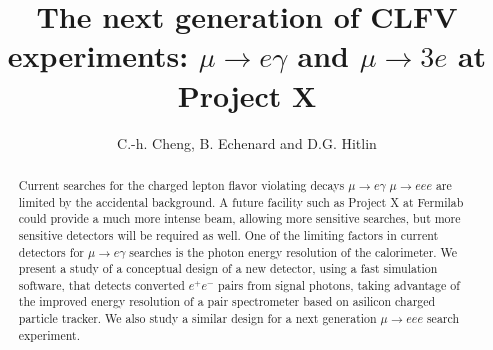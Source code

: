 \documentclass[12pt]{article}
\begin{document}

\title{The next generation of 
CLFV experiments:\break
$\mu \to e \gamma$ and  $\mu \to 3e$ at Project X}

\author{C.-h. Cheng, B. Echenard and D.G. Hitlin}

\maketitle

\begin{abstract}
Current searches for the charged lepton flavor violating decays $\mu\to e \gamma$ $\mu\to eee$ are
limited by the accidental background. A future facility such as Project X at 
Fermilab could provide a much more intense beam, allowing more sensitive searches, but more
sensitive detectors will be required as well. One of the limiting factors in current detectors
for $\mu \to e \gamma$ searches is the photon energy resolution of the calorimeter. We present a study of a
conceptual design of a new detector, using a fast simulation software, that
detects converted $e^+e^-$ pairs from signal photons, taking advantage of the  improved
energy resolution of a pair spectrometer based on asilicon charged particle tracker.  We also study
a similar design for a next generation $\mu\to eee$ search experiment.
\end{abstract}








\end{document}
